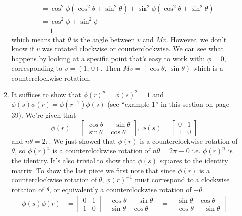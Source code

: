 \documentclass[]{article}
\begin{document}
\begin{enumerate}
\begin{enumerate}
\begin{align}
&= \cos^2\phi(\cos^2\theta + \sin^2\theta) + \sin^2\phi(\cos^2\theta + \sin^2\theta) \\
&= \cos^2\phi + \sin^2\phi \\
&= 1
\end{align}
which means that $\theta$ is the angle between $v$ and $Mv$. However, we don't know if $v$ was rotated clockwise or counterclockwise. We can see what happens by looking at a specific point that's easy to work with: $\phi = 0$, corresponding to $v = (1,\,0)$. Then $Mv = (\cos\theta,\,\sin\theta)$ which is a counterclockwise rotation.
\item It suffices to show that $\phi(r)^n = \phi(s)^2 = 1$ and $\phi(s)\phi(r) = \phi(r^{-1})\phi(s)$ (see ``example 1'' in this section on page 39). We're given that
\begin{equation}
\phi(r) = \begin{bmatrix}\cos\theta & -\sin\theta \\ \sin\theta & \cos\theta\end{bmatrix},\ \phi(s) = \begin{bmatrix}0&1\\1&0\end{bmatrix}
\end{equation}
and $n\theta = 2\pi$. We just showed that $\phi(r)$ is a counterclockwise rotation of $\theta$, so $\phi(r)^n$ is a counterclockwise rotation of $n\theta = 2\pi \equiv 0$ i.e. $\phi(r)^n$ is the identity. It's also trivial to show that $\phi(s)$ squares to the identity matrix. To show the last piece we first note that since $\phi(r)$ is a counterclockwise rotation of $\theta$, $\phi(r)^{-1}$ must correspond to a clockwise rotation of $\theta$, or equivalently a counterclockwise rotation of $-\theta$.
\begin{align}
\phi(s)\phi(r) &= \begin{bmatrix}0&1\\1&0\end{bmatrix}\begin{bmatrix}\cos\theta & -\sin\theta \\ \sin\theta & \cos\theta\end{bmatrix} = \begin{bmatrix}\sin\theta & \cos\theta \\ \cos\theta & -\sin\theta\end{bmatrix} \\

\end{align}
\end{enumerate}
\end{enumerate}
\end{document}
